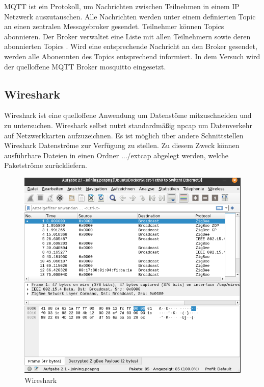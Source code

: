 MQTT \cite{mqtt} ist ein Protokoll, um Nachrichten zwischen Teilnehmen in einem IP Netzwerk auszutauschen. Alle Nachrichten werden unter einem definierten \grqq Topic \grqq{} 
an einen zentralen Messagebroker gesendet. Teilnehmer können \grqq Topics \grqq{} abonnieren. Der Broker verwaltet eine Liste mit allen Teilnehmern sowie 
deren abonnierten \grqq Topics \grqq{}. Wird eine entsprechende Nachricht an den Broker gesendet, werden alle Abonennten des Topics entsprechend informiert.
In dem Versuch wird der quelloffene MQTT Broker \grqq mosquitto\grqq{} eingesetzt. 

\subsection{Wireshark}

Wireshark ist eine quelloffene Anwendung um Datenstöme mitzuschneiden und zu untersuchen. Wireshark selbst nutzt standardmäßig \grqq npcap \grqq{} um Datenverkehr 
auf Netzwerkkarten aufzuzeichnen. Es ist möglich über andere Schnittstellen Wireshark Datenströme zur Verfügung zu stellen. Zu diesem Zweck
können ausführbare Dateien in einen Ordner \grqq .../extcap \grqq{} abgelegt werden, welche 
Paketströme zurückliefern. 

\begin{figure}[H]
  \centering
  \includegraphics[width=1\textwidth]{media/wireshark.png}
  \caption{Wireshark}
\end{figure}

